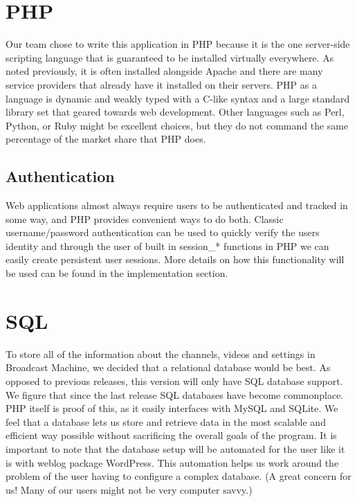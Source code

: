 \documentclass[a4paper,12pt]{report}
\begin{document}
\section{PHP}
Our team chose to write this application in PHP because it is the one server-side scripting language that is guaranteed to be installed virtually everywhere.
As noted previously, it is often installed alongside Apache and there are many service providers that already have it installed on their servers.
PHP as a language is dynamic and weakly typed with a C-like syntax and a large standard library set that geared towards web development.
Other languages such as Perl, Python, or Ruby might be excellent choices, but they do not command the same percentage of the market share that PHP does.


\subsection{Authentication}
Web applications almost always require users to be authenticated and tracked in some way, and PHP provides convenient ways to do both.
Classic username/password authentication can be used to quickly verify the users identity and through the user of built in session\_* functions in PHP we can easily create persistent user sessions.
More details on how this functionality will be used can be found in the implementation section.


\section{SQL}
To store all of the information about the channels, videos and settings in Broadcast Machine, we decided that a relational database would be best. 
As opposed to previous releases, this version will only have SQL database support.
We figure that since the last release SQL databases have become commonplace.
PHP itself is proof of this, as it easily interfaces with MySQL and SQLite.
We feel that a database lets us store and retrieve data in the most scalable and efficient way possible without sacrificing the overall goals of the program.
It is important to note that the database setup will be automated for the user like it is with weblog package WordPress.
This automation helps us work around the problem of the user having to configure a complex database. (A great concern for us! Many of our users might not be very computer savvy.)
\end{document}
